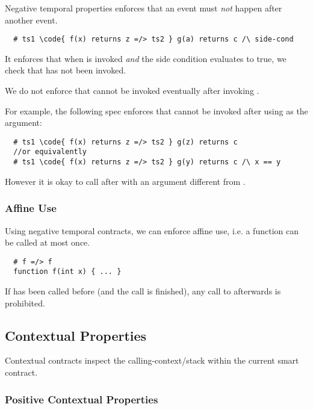 Negative temporal properties enforces that an event must \emph{not}
happen after another event.

\begin{lstlisting}
  # ts1 \code{ f(x) returns z =/> ts2 } g(a) returns c /\ side-cond
\end{lstlisting}
It enforces that when  is invoked \emph{and} the side condition
evaluates to true, we check that  has not been invoked.

We do not enforce that  cannot be invoked eventually
after invoking .

For example, the following spec enforces that  cannot be
invoked after  using  as the argument:
\begin{lstlisting}
  # ts1 \code{ f(x) returns z =/> ts2 } g(z) returns c
  //or equivalently
  # ts1 \code{ f(x) returns z =/> ts2 } g(y) returns c /\ x == y
\end{lstlisting}
However it is okay to call  after  with an argument different from .

\subsubsection*{Affine Use}

Using negative temporal contracts, we can enforce affine use, i.e.
a function can be called at most once.
\begin{lstlisting}
  # f =/> f
  function f(int x) { ... }
\end{lstlisting}
If  has been called before (and the call is finished), any
call to  afterwards is prohibited.



\subsection{Contextual Properties}

Contextual contracts inspect the calling-context/stack within the
current smart contract.


\subsubsection{Positive Contextual Properties}

